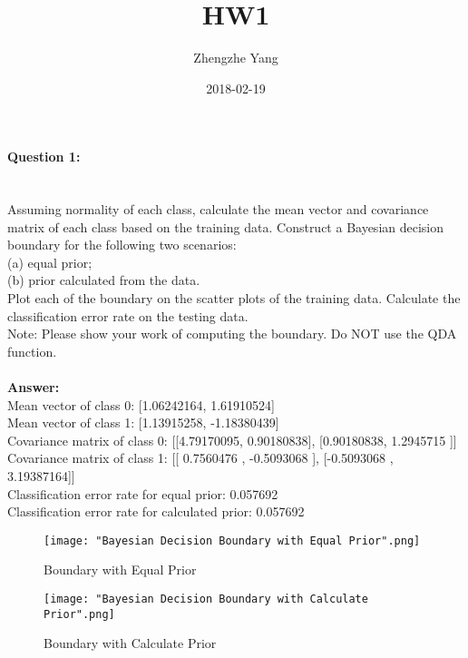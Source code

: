 \documentclass[10pt]{article}
\title{HW1}
\date{2018-02-19}
\author{Zhengzhe Yang}
\begin{document}
	\maketitle
	\newpage
	
	\paragraph{Question 1: }\mbox{}\\
	Assuming normality of each class, calculate the mean vector and covariance matrix of each class based on the training data. Construct a Bayesian decision boundary for the following two scenarios:\\
	(a) equal prior; \\
	(b) prior calculated from the data.\\
	Plot each of the boundary on the scatter plots of the training data. Calculate the classification error rate on the testing data.\\
	Note: Please show your work of computing the boundary. Do NOT use the QDA function.\\
	\\
	\textbf{Answer:}\\
	Mean vector of class 0: [1.06242164, 1.61910524]\\
	Mean vector of class 1: [1.13915258, -1.18380439]\\
	Covariance matrix of class 0: [[4.79170095, 0.90180838], [0.90180838, 1.2945715 ]]\\
	Covariance matrix of class 1: [[ 0.7560476 , -0.5093068 ], [-0.5093068 ,  3.19387164]]\\
	Classification error rate for equal prior: 0.057692\\
	Classification error rate for calculated prior: 0.057692\\
	\begin{figure}[h!]
    	\begin{minipage}{0.65\textwidth}
		\centering
        		\texttt{[image: "Bayesian Decision Boundary with Equal Prior".png]} 
        		\caption{Boundary with Equal Prior}
    	\end{minipage}\hfill
    	\begin{minipage}{0.65\textwidth}
		\centering
        		\texttt{[image: "Bayesian Decision Boundary with Calculate Prior".png]} 
        		\caption{Boundary with Calculate Prior}
   	 \end{minipage}
	\end{figure}
	
\end{document}
